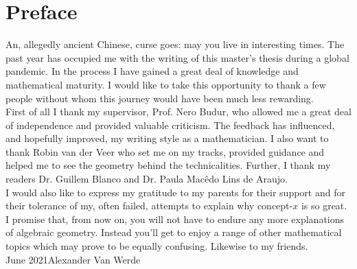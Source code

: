 \chapter*{Preface}
An, allegedly ancient Chinese, curse goes: may you live in interesting times.
The past year has occupied me with the writing of this master's thesis during a global pandemic.
In the process I have gained a great deal of knowledge and mathematical maturity.
I would like to take this opportunity to thank a few people without whom this journey would have been much less rewarding.\\

\noindent
First of all I thank my supervisor, Prof. Nero Budur, who allowed me a great deal of independence and provided valuable criticism.
The feedback has influenced, and hopefully improved, my writing style as a mathematician.
I also want to thank Robin van der Veer who set me on my tracks, provided guidance and helped me to see the geometry behind the technicalities. 
Further, I thank my readers Dr. Guillem Blanco and Dr. Paula Mac\^edo Lins de Araujo.
\\

\noindent
I would also like to express my gratitude to my parents for their support and for their tolerance of my, often failed, attempts to explain why concept-$x$ is so great.
I promise that, from now on, you will not have to endure any more explanations of algebraic geometry.
Instead you'll get to enjoy a range of other mathematical topics which may prove to be equally confusing. Likewise to my friends.\\[2em]

\noindent
June 2021\hfill Alexander Van Werde